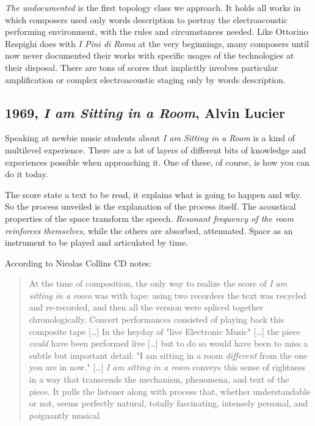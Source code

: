 \documentclass[twoside,a4paper]{article}
\begin{document}
\emph{The undocumented} is the first topology class we approach. It holds all works in which composers used only words description to portray the electroacoustic performing environment, with the rules and circumstances needed. Like Ottorino Respighi does with \emph{I Pini di Roma} at the very beginnings, many composers until now never documented their works with specific usages of the technologies at their disposal. There are tons of scores that implicitly involves particular amplification or complex electroacoustic staging only by words description. 


\subsection{1969, \emph{I am Sitting in a Room}, Alvin Lucier}

Speaking at newbie music students about \emph{I am Sitting in a Room} is a kind of multilevel experience. There are a lot of layers of different bits of knowledge and experiences possible when approaching it. One of these, of course, is how you can do it today. 

The score state a text to be read, it explains what is going to happen and why. So the process unveiled is the explanation of the process itself. The acoustical properties of the space transform the speech. \emph{Resonant frequency of the room reinforces themselves}, while the others are absorbed, attenuated. Space as an instrument to be played and articulated by time. 

According to Nicolas Collins CD notes\cite{alCD90}:

\begin{quote}
At the time of composition, the only way to realize the score of \emph{I am sitting in a room} was with tape: using two recorders the text was recycled and re-recorded, and then all the version were spliced together chronologically. Concert performances consisted of playing back this composite tape [\ldots] In the heyday of "live Electronic Music" [\ldots] the piece \emph{could} have been performed live [\ldots] but to do so would have been to miss a subtle but important detail: "I am sitting in a room \emph{different} from the one you are in now." [\ldots] \emph{I am sitting in a room} conveys this sense of rightness in a way that transcends the mechanism, phenomena, and text of the piece. It pulls the listener along with process that, whether understandable or not, seems perfectly natural, totally fascinating, intensely personal, and poignantly musical. 
\end{quote}
\end{document}
